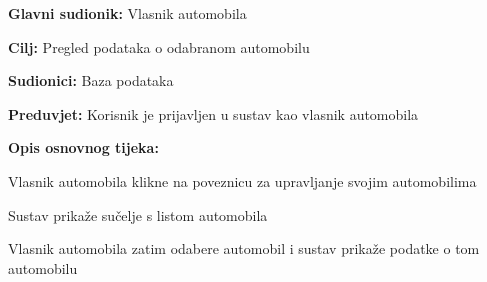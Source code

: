 \noindent {}
\begin{packed_item}
	
	\item \textbf{Glavni sudionik: } Vlasnik automobila
	\item  \textbf{Cilj:} Pregled podataka o odabranom automobilu
	\item  \textbf{Sudionici:} Baza podataka
	\item  \textbf{Preduvjet:} Korisnik je prijavljen u sustav kao vlasnik automobila
	\item  \textbf{Opis osnovnog tijeka:}
	
	\item[] \begin{packed_enum}
		
		\item Vlasnik automobila klikne na poveznicu za upravljanje svojim automobilima
		\item Sustav prikaže sučelje s listom automobila
		\item Vlasnik automobila zatim odabere automobil i sustav prikaže podatke o tom
		automobilu
		
	\end{packed_enum}
\end{packed_item}

